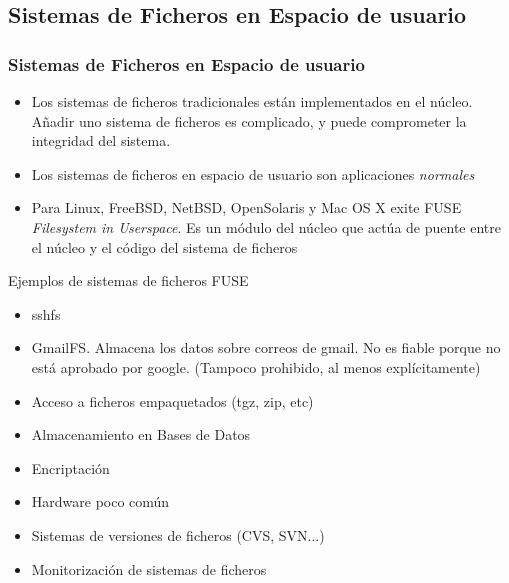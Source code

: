 \documentclass[ucs]{beamer}
\begin{document}



\subsection{Sistemas de Ficheros en Espacio de usuario}
\begin{frame}[fragile]
\frametitle{Sistemas de Ficheros en Espacio de usuario}
\begin{itemize}	
\item
Los sistemas de ficheros tradicionales están implementados 
en el núcleo. Añadir uno sistema de ficheros es complicado, 
y puede comprometer la integridad del sistema.
\item 
Los sistemas de ficheros en espacio de usuario son aplicaciones
\emph{normales}
\item 
Para Linux, FreeBSD, NetBSD, OpenSolaris y Mac OS X exite FUSE
\emph{Filesystem in Userspace}. Es un módulo del núcleo que
actúa de puente entre el núcleo y el código del sistema de
ficheros

\end{itemize}
\end{frame}



\begin{frame}[fragile]
Ejemplos de sistemas de ficheros FUSE
\begin{itemize}	
\item
sshfs
\item 
GmailFS. Almacena los datos sobre correos de gmail. No es fiable
porque no está aprobado por google. (Tampoco prohibido, al menos
explícitamente)
\item 
Acceso a ficheros empaquetados (tgz, zip, etc)
\item
Almacenamiento en Bases de Datos
\item
Encriptación
\item
Hardware poco común
\item
Sistemas de versiones de ficheros (CVS, SVN...)
\item
Monitorización de sistemas de ficheros
\end{itemize}

\end{frame}
\end{document}
